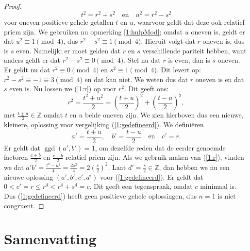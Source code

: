 \documentclass[12pt,reqno]{article}
\newcommand*{\ZZ}{\ensuremath{\mathbb{Z}}}
\theoremstyle{theorem}
\theoremstyle{definition}
\DeclareMathOperator{\ggd}{ggd}
\begin{document}
\begin{proof}
		\begin{equation}\label{1:r}
			t^2 = r^2 + s^2 \quad \text{en} \quad u^2 = r^2 - s^2
		\end{equation}
		voor oneven positieve gehele getallen $t$ en $u$, waarvoor geldt dat deze ook relatief priem zijn. We gebruiken nu opmerking \ref{1:hulpMod}; omdat $u$ oneven is, geldt er dat $u^2 \equiv 1 \pmod{4}$, dus $r^2 - s^2 \equiv 1 \pmod{4}$. Hieruit volgt dat $r$ oneven is, dus is $s$ even. Namelijk: er moet gelden dat $r$ en $s$ verschillende pariteit hebben, want anders geldt er dat $r^2 - s^2 \equiv 0 \pmod{4}$. Stel nu dat $r$ is even, dan is $s$ oneven. Er geldt nu dat $r^2 \equiv 0 \pmod{4}$ en $s^2 \equiv 1 \pmod{4}$. Dit levert op: $r^2 - s^2 \equiv -1 \equiv 3 \pmod{4}$ en dat kan niet. We weten dus dat $r$ oneven is en dat $s$ even is. Nu lossen we  (\ref{1:r}) op voor $r^2$. Dit geeft ons:
		\begin{equation*}
			r^2 = \frac{t^2 + u^2}{2} = \left( \frac{t+u}{2} \right)^2 + \left( \frac{t-u}{2} \right)^2,
		\end{equation*}
		met $\frac{t \pm u}{2} \in\ZZ$ omdat $t$ en $u$ beide oneven zijn. We zien hierboven dus een nieuwe, kleinere, oplossing voor vergelijking (\ref{1:gedefineerd}). We defini\"eren
		\begin{equation*}
			a' = \frac{t+u}{2}, \quad b' = \frac{t-u}{2} \quad \text{en} \quad c' = r.
		\end{equation*}
		Er geldt dat $\ggd(a',b') = 1$, om dezelfde reden dat de eerder genoemde factoren $\frac{c+b}{2}$ en $\frac{c-b}{2}$ relatief priem zijn. Als we gebruik maken van (\ref{1:r}), vinden we dat $a'b' = \frac{t^2 - u^2}{4} = \frac{2s^2}{4} = 2\left( \frac{s}{2} \right)^2$. Laat $d' = \frac{s}{2} \in\ZZ$, dan hebben we nu een nieuwe oplossing $(a', b', c', d')$ voor (\ref{1:gedefineerd}). Er geldt dat $0 < c'= r \leq r^4 < r^4 + s^4 = c$. Dit geeft een tegenspraak, omdat $c$ minimaal is. Dus (\ref{1:gedefineerd}) heeft geen positieve gehele oplossingen, dus $n=1$ is niet congruent.
	\end{proof}
	
	
	\section{Samenvatting}
	
	
	
	
\end{document}
